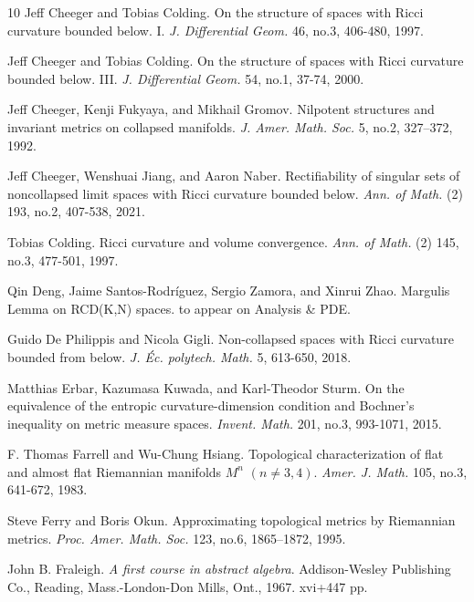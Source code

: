 \documentclass[12pt]{amsart}
\theoremstyle{definition}
\numberwithin{equation}{section}
\begin{document}
\begin{thebibliography}{10}
Jeff Cheeger and  Tobias Colding.
\newblock On the structure of spaces with Ricci curvature bounded below. I. {\em J. Differential Geom. } 46, no.3, 406-480, 1997.


Jeff Cheeger and Tobias Colding.
\newblock On the structure of spaces with Ricci curvature bounded below. III. {\em J. Differential Geom. } 54, no.1, 37-74, 2000. 


Jeff Cheeger, Kenji Fukyaya, and Mikhail Gromov. 
\newblock Nilpotent structures and invariant metrics on collapsed manifolds. {\em J. Amer. Math. Soc. }5, no.2, 327–372, 1992.

Jeff Cheeger, Wenshuai Jiang, and  Aaron Naber.
\newblock Rectifiability of singular sets of noncollapsed limit spaces with Ricci curvature bounded below. {\em Ann. of Math. } (2) 193, no.2, 407-538, 2021. 

Tobias Colding.
\newblock Ricci curvature and volume convergence. {\em Ann. of Math.} (2) 145, no.3, 477-501, 1997.

Qin Deng, Jaime Santos-Rodr\'iguez, Sergio Zamora, and Xinrui Zhao.
\newblock Margulis Lemma on RCD(K,N) spaces. to appear on Analysis \& PDE.



Guido De Philippis and Nicola Gigli.
\newblock Non-collapsed spaces with Ricci curvature bounded from below. {\em J. \'Ec. polytech. Math. }5, 613-650, 2018.

Matthias Erbar, Kazumasa Kuwada, and Karl-Theodor Sturm. 
\newblock On the equivalence of the entropic curvature-dimension condition and Bochner's inequality on metric measure spaces. {\em Invent. Math. }201, no.3, 993-1071, 2015.

F. Thomas Farrell and Wu-Chung Hsiang.
\newblock Topological characterization of flat and almost flat Riemannian manifolds $M^n$ $(n \neq 3, 4)$. {\em Amer. J. Math. }105, no.3,  641-672, 1983.

Steve Ferry and Boris Okun.
\newblock Approximating topological metrics by Riemannian metrics. {\em Proc. Amer. Math. Soc. } 123, no.6, 1865–1872, 1995.


John B. Fraleigh.
{\em A first course in abstract algebra}. Addison-Wesley Publishing Co., Reading, Mass.-London-Don Mills, Ont., 1967. xvi+447 pp.



\end{thebibliography}
\end{document}
